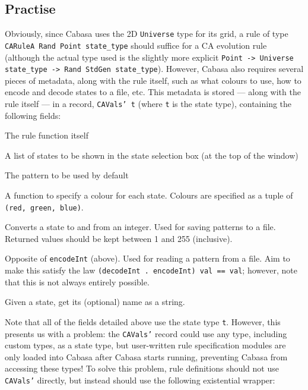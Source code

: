 \documentclass[oneside,a4paper]{memoir}
\begin{document}
\subsection{Practise}
\label{sec:hspr}

Obviously, since Cabasa uses the 2D \texttt{Universe} type for its grid,
  a rule of type \texttt{CARuleA Rand Point state\_type} should suffice for a CA evolution rule
  (although the actual type used is the slightly more explicit
    \texttt{Point -> Universe state\_type -> Rand StdGen state\_type}).
However, Cabasa also requires several pieces of metadata, along with the rule itself,
  such as what colours to use, how to encode and decode states to a file, etc.
This metadata is stored --- along with the rule itself --- in a record, \texttt{CAVals' t}
  (where \texttt{t} is the state type),
  containing the following fields:

\begin{description}[font=\normalfont\bfseries\ttfamily]
\item[\_rule :: Point -> Universe t -> Rand StdGen t]
  The rule function itself
\item[\_states :: {[t]}]
  A list of states to be shown in the state selection box (at the top of the window)
\item[\_defaultPattern :: Universe t]
  The pattern to be used by default
\item[\_state2color :: t -> (Double, Double, Double)]
  A function to specify a colour for each state.
  Colours are specified as a tuple of \texttt{(red, green, blue)}.
\item[\_encodeInt :: t -> Int]
  Converts a state to and from an integer.
  Used for saving patterns to a file.
  Returned values should be kept between 1 and 255 (inclusive).
\item[\_decodeInt :: Int -> t]
  Opposite of \texttt{encodeInt} (above).
  Used for reading a pattern from a file.
  Aim to make this satisfy the law \texttt{(decodeInt . encodeInt) val == val};
    however, note that this is not always entirely possible.
\item[\_getName :: t -> Maybe String]
  Given a state, get its (optional) name as a string.
\end{description}

Note that all of the fields detailed above use the state type \texttt{t}.
However, this presents us with a problem:
  the \texttt{CAVals'} record could use any type, including custom types, as a state type,
  but user-written rule specification modules
  are only loaded into Cabasa after Cabasa starts running,
  preventing Cabasa from accessing these types!
To solve this problem, rule definitions should not use \texttt{CAVals'} directly,
  but instead should use the following existential wrapper:
\end{document}
